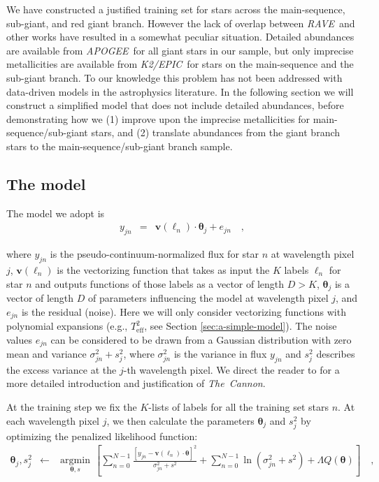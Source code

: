 \documentclass[preprint,trackchanges]{aastex}
\newcommand{\acronym}[1]{{\small{#1}}}
\newcommand{\project}[1]{\textsl{#1}}
\newcommand{\thecannon}{\project{The~Cannon}}
\newcommand{\rave}{\project{\acronym{RAVE}}}
\newcommand{\apogee}{\project{\acronym{APOGEE}}}
\newcommand{\epic}{\project{K2/EPIC}}
\newcommand{\teff}{T_{\mathrm{eff}}}
\newcommand{\Dvector}[1]{\boldsymbol{#1}}
\newcommand{\vectheta}{\Dvector{\theta}}
\newcommand{\vecv}{\Dvector{v}}
\newcommand{\argmin}[1]{\underset{#1}{\operatorname{argmin}}\,}
\begin{document}
We have constructed a justified training set for stars across the main-sequence, sub-giant,
and red giant branch.  However the lack of overlap between \rave\ and other works have
resulted in a somewhat peculiar situation. Detailed abundances are available from \apogee\
for all giant stars in our sample, but only imprecise metallicities are available from
\epic\ for stars on the main-sequence and the sub-giant branch.  To our knowledge this 
problem has not been addressed with data-driven models in the astrophysics literature.
In the following section we will construct a simplified model that does not include detailed
abundances, before demonstrating how we (1) improve upon the imprecise metallicities for 
main-sequence/sub-giant stars, and (2) translate abundances from the giant branch stars 
to the main-sequence/sub-giant branch sample.


\subsection{The model}
\label{sec:the-model}

\noindent{}The model we adopt is
\begin{eqnarray}\label{eq:model}
y_{jn} & = & \vecv(\ell_n)\cdot\vectheta_j + e_{jn}\quad ,
\end{eqnarray}

\noindent{}where $y_{jn}$ is the pseudo-continuum-normalized flux for star $n$ at wavelength pixel
$j$, $\vecv(\ell_n)$ is the vectorizing function that takes as input the $K$ labels
$\ell_n$ for star $n$ and outputs functions of those labels as a vector of length
$D>K$, $\vectheta_j$ is a vector of length $D$ of parameters influencing the model at
wavelength pixel $j$, and $e_{jn}$ is the residual (noise).  Here we will only consider
vectorizing functions with polynomial expansions (e.g., $\teff^2$, see Section 
\ref{sec:a-simple-model}).  The noise values $e_{jn}$ can be considered to be drawn 
from a Gaussian distribution with zero mean and variance $\sigma_{jn}^2 + s_j^2$, where
$\sigma_{jn}^2$ is the variance in flux $y_{jn}$ and $s_j^2$ describes the excess 
variance at the $j$-th wavelength pixel.  We direct the reader to \citet{Ness_2015} for
a more detailed introduction and justification of \thecannon.


At the training step we fix the $K$-lists of labels for all the training set stars $n$.
At each wavelength pixel $j$, we then calculate the parameters $\vectheta_j$ and $s_j^2$
by optimizing the penalized likelihood function:
\begin{eqnarray}\label{eq:train}
\vectheta_j,s^2_j &\leftarrow& \argmin{\vectheta,s}\left[
    \sum_{n=0}^{N-1} \frac{[y_{jn}-\vecv(\ell_n)\cdot\vectheta]^2}{\sigma^2_{jn}+s^2}
    + \sum_{n=0}^{N-1} \ln(\sigma^2_{jn}+s^2) + \Lambda{}Q(\vectheta)
    \right]
  \quad ,
\end{eqnarray}
\end{document}
